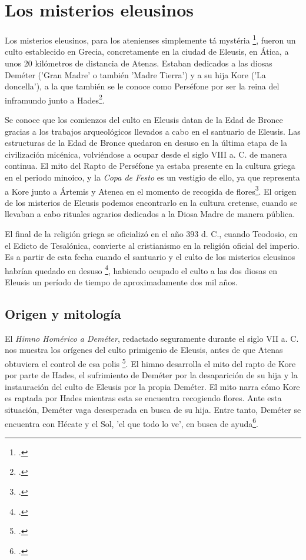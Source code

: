    \chapter{Los misterios eleusinos}

Los misterios eleusinos, para los atenienses simplemente tá mystéria \footcite[367]{burkertReligionGriegaArcaica2007}, fueron un culto establecido en Grecia, concretamente en la ciudad de Eleusis, en Ática, a unos 20 kilómetros de distancia de Atenas. Estaban dedicados a las diosas Deméter ('Gran Madre' o también 'Madre Tierra') y a su hija Kore ('La doncella'), a la que también se le conoce como Perséfone por ser la reina del inframundo junto a Hades\footcite[20]{w.meyerAncientMysteriesSource1986}.

Se conoce que los comienzos del culto en Eleusis datan de la Edad de Bronce gracias a los trabajos arqueológicos llevados a cabo en el santuario de Eleusis. Las estructuras de la Edad de Bronce quedaron en desuso en la última etapa de la civilización micénica, volviéndose a ocupar desde el siglo VIII a. C. de manera continua. El mito del Rapto de Perséfone ya estaba presente en la cultura griega en el periodo minoico, y la\textit{ Copa de Festo} es un vestigio de ello, ya que representa a Kore junto a Ártemis y Atenea en el momento de recogida de flores\footcite[12]{burkertAncientMysteryCults1987}.  El origen de los misterios de Eleusis podemos encontrarlo en la cultura cretense, cuando se llevaban a cabo rituales agrarios dedicados a la Diosa Madre de manera pública.

El final de la religión griega se oficializó en el año 393 d. C., cuando Teodosio, en el Edicto de Tesalónica, convierte al cristianismo en la religión oficial del imperio. Es a partir de esta fecha cuando el santuario y el culto de los misterios eleusinos habrían quedado en desuso \footcite[124]{burkertReligionGriegaArcaica2007}, habiendo ocupado el culto a las dos diosas en Eleusis un período de tiempo de aproximadamente dos mil años.


\section{Origen y mitología}

El \textit{Himno Homérico a Deméter}, redactado seguramente durante el siglo VII a. C. nos muestra los orígenes del culto primigenio de Eleusis, antes de que Atenas obtuviera el control de esa polis \footcite[20]{w.meyerAncientMysteriesSource1986}. El himno desarrolla el mito del rapto de Kore por parte de Hades, el sufrimiento de Deméter por la desaparición de su hija y la instauración del culto de Eleusis por la propia Deméter. El mito narra cómo Kore es raptada por Hades mientras esta se encuentra recogiendo flores. Ante esta situación, Deméter vaga desesperada en busca de su hija. Entre tanto, Deméter se encuentra con Hécate y el Sol, 'el que todo lo ve', en busca de ayuda\footcite[49-53]{b.torresHimnoHomericoDemeter2001}.

